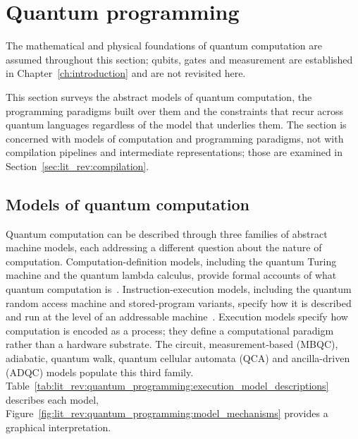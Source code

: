 \section{Quantum programming}\label{sec:lit_rev:quantum_programming}

The mathematical and physical foundations of quantum computation are assumed throughout this section; qubits, gates and measurement are established in Chapter~\ref{ch:introduction} and are not revisited here.

This section surveys the abstract models of quantum computation, the programming paradigms built over them and the constraints that recur across quantum languages regardless of the model that underlies them.
The section is concerned with models of computation and programming paradigms, not with compilation pipelines and intermediate representations; those are examined in Section~\ref{sec:lit_rev:compilation}.

\subsection{Models of quantum computation}\label{subsec:lit_rev:quantum_programming:models_of_computation}

Quantum computation can be described through three families of abstract machine models, each addressing a different question about the nature of computation.
Computation-definition models, including the quantum Turing machine and the quantum lambda calculus, provide formal accounts of what quantum computation is~\cite{nunez_corrales2025betterabstractmachines,wang2023qrasp}.
Instruction-execution models, including the quantum random access machine and stored-program variants, specify how it is described and run at the level of an addressable machine~\cite{nunez_corrales2025betterabstractmachines,wang2023qrasp}.
Execution models specify how computation is encoded as a process; they define a computational paradigm rather than a hardware substrate.
The circuit, measurement-based (MBQC), adiabatic, quantum walk, quantum cellular automata (QCA) and ancilla-driven (ADQC) models populate this third family.
Table~\ref{tab:lit_rev:quantum_programming:execution_model_descriptions} describes each model, Figure~\ref{fig:lit_rev:quantum_programming:model_mechanisms} provides a graphical interpretation.

